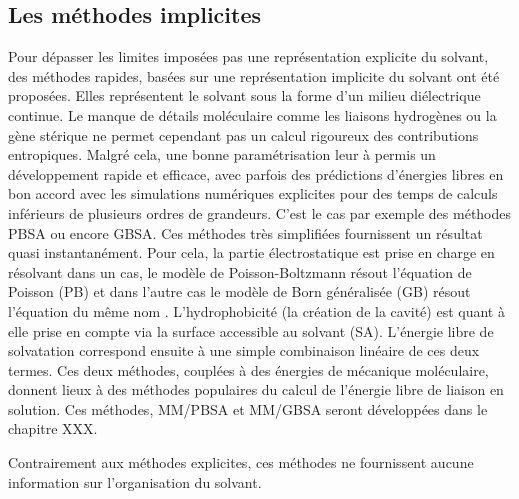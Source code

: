 \subsection{Les méthodes implicites}
Pour dépasser les limites imposées pas une représentation explicite du solvant, des méthodes rapides, basées sur une représentation implicite du solvant ont été proposées\cite{Skyner_review_2015}. Elles représentent le solvant sous la forme d'un milieu diélectrique continue. Le manque de détails moléculaire comme les liaisons hydrogènes ou la gène stérique ne permet cependant pas un calcul rigoureux des contributions entropiques. Malgré cela, une bonne paramétrisation leur à permis un développement rapide et efficace, avec parfois des prédictions d'énergies libres en bon accord avec les simulations numériques explicites pour des temps de calculs inférieurs de plusieurs ordres de grandeurs. C'est le cas par exemple des méthodes PBSA ou encore GBSA. Ces méthodes très simplifiées fournissent un résultat quasi instantanément. Pour cela, la partie électrostatique est prise en charge en résolvant dans un cas, le modèle de Poisson-Boltzmann résout l'équation de Poisson (PB) et dans l'autre cas le modèle de Born généralisée (GB) résout l'équation du même nom  \cite{Skyner_review_2015}. L'hydrophobicité (la création de la cavité) est quant à elle prise en compte via la surface accessible au solvant (SA). L'énergie libre de solvatation correspond ensuite à une simple combinaison linéaire de ces deux termes.  Ces deux méthodes, couplées à des énergies de mécanique moléculaire, donnent lieux à des méthodes populaires du calcul de l'énergie libre de liaison en solution. Ces méthodes, MM/PBSA\cite{Genheden__MMPBSA_2015} et MM/GBSA seront développées dans le chapitre XXX.

Contrairement aux méthodes explicites, ces méthodes ne fournissent aucune information sur l'organisation du solvant.


